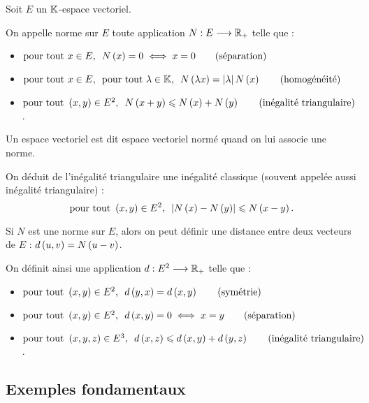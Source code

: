 \begin{defi}
Soit \(E\) un \(\mathbb{K}\)-espace vectoriel.

On appelle norme sur \(E\) toute application \(N:E\longrightarrow\mathbb{R}_+\) telle que :

\begin{itemize}
    \item \(\quantifs{\tpt x\in E}N\paren{x}=0\ssi x=0\qquad\text{(séparation)}\) \\
    \item \(\quantifs{\tpt x\in E;\tpt\lambda\in\K}N\paren{\lambda x}=\abs{\lambda}N\paren{x}\qquad\text{(homogénéité)}\) \\
    \item \(\quantifs{\tpt\paren{x,y}\in E^2}N\paren{x+y}\leq N\paren{x}+N\paren{y}\qquad\text{(inégalité triangulaire)}\).
\end{itemize}

Un espace vectoriel est dit espace vectoriel normé quand on lui associe une norme.
\end{defi}

On déduit de l'inégalité triangulaire une inégalité classique (souvent appelée aussi inégalité triangulaire) : \[\quantifs{\tpt\paren{x,y}\in E^2}\abs{N\paren{x}-N\paren{y}}\leq N\paren{x-y}.\]

Si \(N\) est une norme sur \(E\), alors on peut définir une distance entre deux vecteurs de \(E\) : \(d\left(u,v\right)=N\left(u-v\right)\).

On définit ainsi une application \(d:E^2\longrightarrow\mathbb{R}_+\) telle que :

\begin{itemize}
    \item \(\quantifs{\tpt\paren{x,y}\in E^2}d\paren{y,x}=d\paren{x,y}\qquad\text{(symétrie)}\) \\
    \item \(\quantifs{\tpt\paren{x,y}\in E^2}d\paren{x,y}=0\ssi x=y\qquad\text{(séparation)}\) \\
    \item \(\quantifs{\tpt\paren{x,y,z}\in E^3}d\paren{x,z}\leq d\paren{x,y}+d\paren{y,z}\qquad\text{(inégalité triangulaire)}\).
\end{itemize}

\subsection{Exemples fondamentaux}

